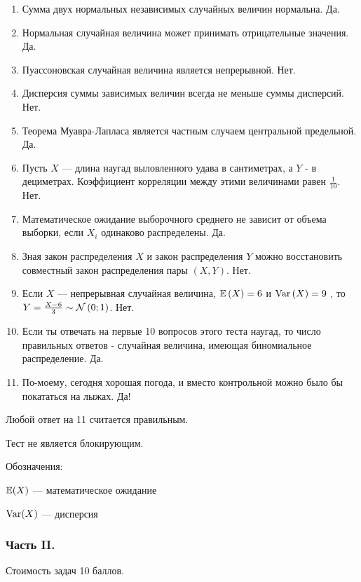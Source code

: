 \begin{enumerate}
\item Сумма двух нормальных независимых случайных величин нормальна.
Да.
\item Нормальная случайная величина может принимать отрицательные
значения. Да.
\item Пуассоновская случайная величина является непрерывной. Нет.
\item Дисперсия суммы зависимых величин всегда не меньше суммы
дисперсий. Нет.
\item Теорема Муавра-Лапласа является частным случаем центральной
предельной. Да.
\item Пусть $X$ — длина наугад выловленного удава в сантиметрах, а
$Y$ - в дециметрах. Коэффициент корреляции между этими
величинами равен $\frac{1}{10}$. Нет.
\item Математическое ожидание выборочного среднего не зависит от
объема выборки, если $X_{i}$ одинаково распределены. Да.
\item Зная закон распределения $X$ и закон распределения $Y$
можно восстановить совместный закон распределения пары $(X,Y)$. Нет.
\item Если  $X$  — непрерывная случайная величина,  $\mathbb{E}\left(X\right)=6$  и
$\operatorname{Var}\left(X\right)=9$ , то  $Y=\frac{X-6}{3} \sim
\mathcal{N}\left(0;1\right)$.  Нет.
\item Если ты отвечать на первые 10 вопросов этого теста наугад, то
число правильных ответов - случайная величина, имеющая
биномиальное распределение. Да.
\item По-моему, сегодня хорошая погода, и вместо контрольной можно
было бы покататься на лыжах. Да!
\end{enumerate}


Любой ответ на 11 считается правильным.

Тест не является блокирующим.

Обозначения:

$\mathbb{E}(X)$ — математическое ожидание

$\operatorname{Var}(X)$ — дисперсия

\subsubsection*{Часть II.}

Стоимость задач 10 баллов.

